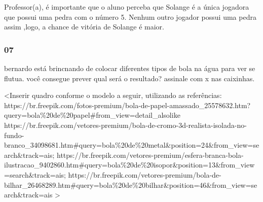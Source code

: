 Professor(a), é importante que o aluno perceba que Solange é a única
jogadora que possui uma pedra com o número 5. Nenhum outro jogador
possui uma pedra assim ,logo, a chance de vitória de Solange é maior.

\subsubsection{07}\label{section-69}

bernardo está brincnando de colocar diferentes tipos de bola na água
para ver se flutua. você consegue prever qual será o resultado? assinale
com x nas caixinhas.

\textless{}Inserir quadro conforme o modelo a seguir, utilizando as
referências:
https://br.freepik.com/fotos-premium/bola-de-papel-amassado\_25578632.htm?query=bola\%20de\%20papel\#from\_view=detail\_alsolike
https://br.freepik.com/vetores-premium/bola-de-cromo-3d-realista-isolada-no-fundo-branco\_34098681.htm\#query=bola\%20de\%20metal\&position=24\&from\_view=search\&track=ais;
https://br.freepik.com/vetores-premium/esfera-branca-bola-ilustracao\_9402860.htm\#query=bola\%20de\%20isopor\&position=13\&from\_view=search\&track=ais;
https://br.freepik.com/vetores-premium/bola-de-bilhar\_26468289.htm\#query=bola\%20de\%20bilhar\&position=46\&from\_view=search\&track=ais
\textgreater{}

